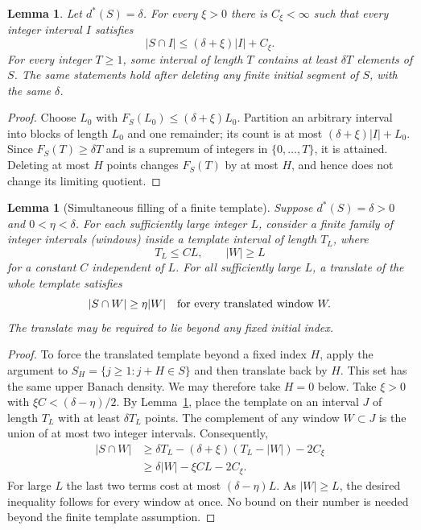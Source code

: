 \documentclass[11pt]{article}
\newtheorem{lemma}[theorem]{Lemma}
\theoremstyle{remark}\newtheorem{remark}[theorem]{Remark}
\begin{document}
\begin{lemma}\label{lem:uniform-upper}
Let $d^*(S)=\delta$. For every $\xi>0$ there is $C_\xi<\infty$ such that every integer interval $I$ satisfies
\[
 |S\cap I|\le(\delta+\xi)|I|+C_\xi.
\]
For every integer $T\ge1$, some interval of length $T$ contains at least $\delta T$ elements of $S$. The same statements hold after deleting any finite initial segment of $S$, with the same $\delta$.
\end{lemma}
\begin{proof}
Choose $L_0$ with $F_S(L_0)\le(\delta+\xi)L_0$. Partition an arbitrary interval into blocks of length $L_0$ and one remainder; its count is at most $(\delta+\xi)|I|+L_0$. Since $F_S(T)\ge\delta T$ and is a supremum of integers in $\{0,\ldots,T\}$, it is attained. Deleting at most $H$ points changes $F_S(T)$ by at most $H$, and hence does not change its limiting quotient.
\end{proof}

\begin{lemma}[Simultaneous filling of a finite template]\label{lem:flatten}
Suppose $d^*(S)=\delta>0$ and $0<\eta<\delta$. For each sufficiently large integer $L$, consider a finite family of integer intervals (windows) inside a template interval of length $T_L$, where
\[
 T_L\le C L,\qquad |W|\ge L
\]
for a constant $C$ independent of $L$. For all sufficiently large $L$, a translate of the whole template satisfies
\[
 |S\cap W|\ge\eta|W|\quad\hbox{for every translated window }W.
\]
The translate may be required to lie beyond any fixed initial index.
\end{lemma}
\begin{proof}
To force the translated template beyond a fixed index $H$, apply the argument to $S_H=\{j\ge1:j+H\in S\}$ and then translate back by $H$. This set has the same upper Banach density. We may therefore take $H=0$ below. Take $\xi>0$ with $\xi C<(\delta-\eta)/2$. By Lemma~\ref{lem:uniform-upper}, place the template on an interval $J$ of length $T_L$ with at least $\delta T_L$ points. The complement of any window $W\subset J$ is the union of at most two integer intervals. Consequently,
\begin{align*}
 |S\cap W|
 &\ge \delta T_L-(\delta+\xi)(T_L-|W|)-2C_\xi\\
 &\ge \delta|W|-\xi C L-2C_\xi.
\end{align*}
For large $L$ the last two terms cost at most $(\delta-\eta)L$. As $|W|\ge L$, the desired inequality follows for every window at once. No bound on their number is needed beyond the finite template assumption.
\end{proof}
\end{document}
